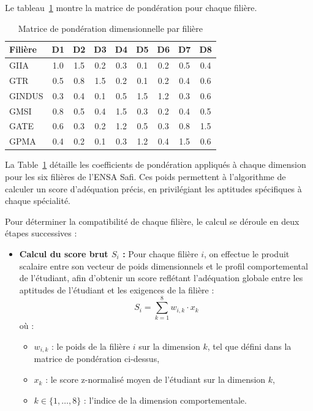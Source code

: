 \documentclass[a4paper,12pt]{article}
\begin{document}
\begin{enumerate}
Le tableau~\ref{tab:ponderation} montre la matrice de pondération pour chaque filière.

\begin{table}[ht!]
\centering
\small
\begin{tabularx}{\linewidth}{X c c c c c c c c}
\toprule
\rowcolor{brownmain!20} \textbf{Filière} & \textbf{D1} & \textbf{D2} & \textbf{D3} & \textbf{D4} & \textbf{D5} & \textbf{D6} & \textbf{D7} & \textbf{D8} \\
\midrule
\rowcolor{brownlight} GIIA   & 1.0 & 1.5 & 0.2 & 0.3 & 0.1 & 0.2 & 0.5 & 0.4 \\
GTR    & 0.5 & 0.8 & 1.5 & 0.2 & 0.1 & 0.2 & 0.4 & 0.6 \\
\rowcolor{brownlight} GINDUS & 0.3 & 0.4 & 0.1 & 0.5 & 1.5 & 1.2 & 0.3 & 0.6 \\
GMSI   & 0.8 & 0.5 & 0.4 & 1.5 & 0.3 & 0.2 & 0.4 & 0.5 \\
\rowcolor{brownlight} GATE   & 0.6 & 0.3 & 0.2 & 1.2 & 0.5 & 0.3 & 0.8 & 1.5 \\
GPMA   & 0.4 & 0.2 & 0.1 & 0.3 & 1.2 & 0.4 & 1.5 & 0.6 \\
\bottomrule
\end{tabularx}
\caption{Matrice de pondération dimensionnelle par filière}
\label{tab:ponderation}
\end{table}
La Table~\ref{tab:ponderation} détaille les coefficients de pondération appliqués à chaque dimension pour les six filières de l'ENSA Safi. Ces poids permettent à l'algorithme de calculer un score d'adéquation précis, en privilégiant les aptitudes spécifiques à chaque spécialité.

Pour déterminer la compatibilité de chaque filière, le calcul se déroule en deux étapes successives :
\begin{itemize}
    \item \textbf{Calcul du score brut $S_i$ :} Pour chaque filière $i$, on effectue le produit scalaire entre son vecteur de poids dimensionnels et le profil comportemental de l'étudiant, afin d'obtenir un score reflétant l'adéquation globale entre les aptitudes de l'étudiant et les exigences de la filière :
    \begin{equation}
        S_i = \sum_{k=1}^{8} w_{i,k} \cdot x_k
    \end{equation}
    où :
    \begin{itemize}
        \item $w_{i,k}$ : le poids de la filière $i$ sur la dimension $k$, tel que défini dans la matrice de pondération ci-dessus,
        \item $x_k$ : le score z-normalisé moyen de l'étudiant sur la dimension $k$,
        \item $k \in \{1, \ldots, 8\}$ : l'indice de la dimension comportementale.
    \end{itemize}


\end{itemize}
\end{enumerate}
\end{document}
